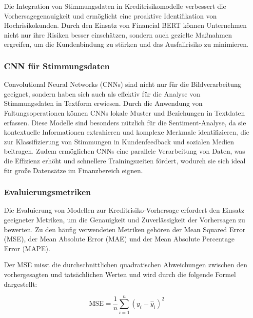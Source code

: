 Die Integration von Stimmungsdaten in Kreditrisikomodelle verbessert die Vorhersagegenauigkeit und ermöglicht eine proaktive Identifikation von Hochrisikokunden. Durch den Einsatz von Financial BERT können Unternehmen nicht nur ihre Risiken besser einschätzen, sondern auch gezielte Maßnahmen ergreifen, um die Kundenbindung zu stärken und das Ausfallrisiko zu minimieren.

\autocite{devlin2019}
\autocite{finbert2019}
\autocite{yang2020}

\subsubsection{CNN für Stimmungsdaten}

Convolutional Neural Networks (CNNs) sind nicht nur für die Bildverarbeitung geeignet, sondern haben sich auch als effektiv für die Analyse von Stimmungsdaten in Textform erwiesen. Durch die Anwendung von Faltungsoperationen können CNNs lokale Muster und Beziehungen in Textdaten erfassen. Diese Modelle sind besonders nützlich für die Sentiment-Analyse, da sie kontextuelle Informationen extrahieren und komplexe Merkmale identifizieren, die zur Klassifizierung von Stimmungen in Kundenfeedback und sozialen Medien beitragen. Zudem ermöglichen CNNs eine parallele Verarbeitung von Daten, was die Effizienz erhöht und schnellere Trainingszeiten fördert, wodurch sie sich ideal für große Datensätze im Finanzbereich eignen.

\autocite{kim2014convolutional}
\autocite{zhang2015sensitivity}

\subsubsection{Evaluierungsmetriken}

Die Evaluierung von Modellen zur Kreditrisiko-Vorhersage erfordert den Einsatz geeigneter Metriken, um die Genauigkeit und Zuverlässigkeit der Vorhersagen zu bewerten. Zu den häufig verwendeten Metriken gehören der Mean Squared Error (MSE), der Mean Absolute Error (MAE) und der Mean Absolute Percentage Error (MAPE).

Der MSE misst die durchschnittlichen quadratischen Abweichungen zwischen den vorhergesagten und tatsächlichen Werten und wird durch die folgende Formel dargestellt:

\begin{equation}
	\text{MSE} = \frac{1}{n} \sum_{i=1}^{n} (y_i - \hat{y}_i)^2
\end{equation}

